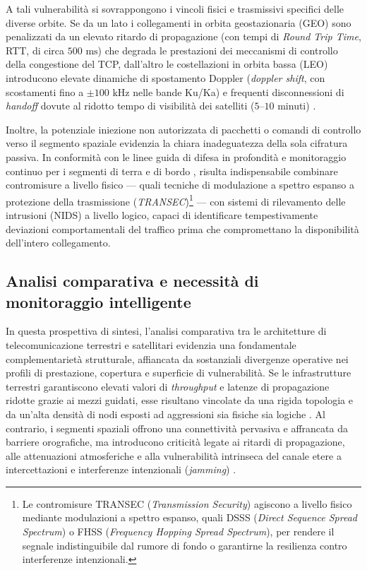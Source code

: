 A tali vulnerabilità si sovrappongono i vincoli fisici e trasmissivi specifici delle diverse orbite. 
Se da un lato i collegamenti in orbita geostazionaria (GEO) sono penalizzati da un elevato ritardo di propagazione (con tempi di \textit{Round Trip Time}, RTT, di circa $500\text{ ms}$) che degrada le prestazioni dei meccanismi di controllo della congestione del TCP, dall'altro le costellazioni in orbita bassa (LEO) introducono elevate dinamiche di spostamento Doppler (\textit{doppler shift}, con scostamenti fino a $\pm 100\text{ kHz}$ nelle bande Ku/Ka) e frequenti disconnessioni di \textit{handoff} dovute al ridotto tempo di visibilità dei satelliti ($5\text{--}10$ minuti) \cite{kodheli2021}.

Inoltre, la potenziale iniezione non autorizzata di pacchetti o comandi di controllo verso il segmento spaziale evidenzia la chiara inadeguatezza della sola cifratura passiva. 
In conformità con le linee guida di difesa in profondità e monitoraggio continuo per i segmenti di terra e di bordo \cite{nist2022}, risulta indispensabile combinare contromisure a livello fisico — quali tecniche di modulazione a spettro espanso a protezione della trasmissione (\textit{TRANSEC})\footnote{Le contromisure TRANSEC (\textit{Transmission Security}) agiscono a livello fisico mediante modulazioni a spettro espanso, quali DSSS (\textit{Direct Sequence Spread Spectrum}) o FHSS (\textit{Frequency Hopping Spread Spectrum}), per rendere il segnale indistinguibile dal rumore di fondo o garantirne la resilienza contro interferenze intenzionali.} — con sistemi di rilevamento delle intrusioni (NIDS) a livello logico, capaci di identificare tempestivamente deviazioni comportamentali del traffico prima che compromettano la disponibilità dell'intero collegamento.

\subsection{Analisi comparativa e necessità di monitoraggio intelligente}
\label{subsec:analisi_comparativa_monitoraggio}

In questa prospettiva di sintesi, l'analisi comparativa tra le architetture di telecomunicazione terrestri e satellitari evidenzia una fondamentale complementarietà strutturale, affiancata da sostanziali divergenze operative nei profili di prestazione, copertura e superficie di vulnerabilità. 
Se le infrastrutture terrestri garantiscono elevati valori di \textit{throughput} e latenze di propagazione ridotte grazie ai mezzi guidati, esse risultano vincolate da una rigida topologia e da un'alta densità di nodi esposti ad aggressioni sia fisiche sia logiche \cite{tanenbaum2020}. 
Al contrario, i segmenti spaziali offrono una connettività pervasiva e affrancata da barriere orografiche, ma introducono criticità legate ai ritardi di propagazione, alle attenuazioni atmosferiche e alla vulnerabilità intrinseca del canale etere a intercettazioni e interferenze intenzionali (\textit{jamming}) \cite{kodheli2021}.

